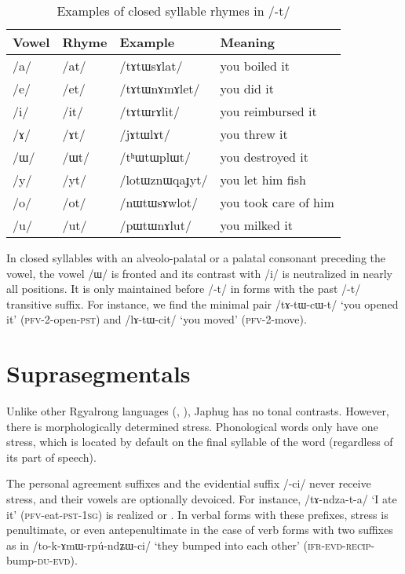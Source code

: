 \documentclass[oneside,a4paper,11pt]{article}
\newcommand{\ipa}[1]{\mbox{\phon/#1/}}
\newcommand{\phonet}[1]{\mbox{\phon[#1]}}
\begin{document}
\begin{table}
 \caption{Examples of closed syllable rhymes in \ipa{-t}} \label{tab:t.rhymes}  \centering
\begin{tabular}{llll}
\toprule
Vowel & Rhyme & Example & Meaning\\
\midrule
\ipa{a} &	   	\ipa{at} &\ipa{tɤtɯsɤlat} &you boiled it\\
\ipa{e} &	  	\ipa{et} &\ipa{tɤtɯnɤmɤlet} & you did it\\
\ipa{i} &	   	\ipa{it} &\ipa{tɤtɯrɤlit} & you reimbursed it\\
\ipa{ɤ} &	   	\ipa{ɤt} &\ipa{jɤtɯlɤt} & you threw it\\
\ipa{ɯ} &	   	\ipa{ɯt} &\ipa{tʰɯtɯplɯt} & you destroyed it \\
\ipa{y} &	 \ipa{yt} &\ipa{lotɯznɯqaɟyt} & you let him fish\\
\ipa{o} & 	\ipa{ot} &\ipa{nɯtɯsɤwlot} & you took care of him\\
\ipa{u} & 	\ipa{ut} & \ipa{pɯtɯnɤlut} & you milked it\\
\bottomrule
\end{tabular}
\end{table}

In closed syllables with an alveolo-palatal or a palatal consonant preceding the vowel, the vowel \ipa{ɯ} is fronted and its contrast with \ipa{i} is neutralized in nearly all positions. It is only maintained before \ipa{-t} in forms with the past \ipa{-t} transitive suffix. For instance, we find the minimal pair \ipa{tɤ-tɯ-cɯ-t} `you opened it' (\textsc{pfv}-2-open-\textsc{pst}) and \ipa{lɤ-tɯ-cit} `you moved' (\textsc{pfv}-2-move).
    
     \section*{Suprasegmentals}
Unlike other Rgyalrong languages (\citealt{jackson05yingao}, \citealt{linyj12tone}), Japhug has no tonal contrasts. However, there is morphologically determined stress. Phonological words only have one stress, which is located by default on the final syllable of the word (regardless of its part of speech).

The personal agreement suffixes and the evidential suffix \ipa{-ci} never receive stress, and their vowels are optionally devoiced. For instance, \ipa{tɤ-ndza-t-a} `I ate it' (\textsc{pfv}-eat-\textsc{pst-1sg}) is realized \phonet{tɤndzátḁ} or \phonet{tɤndzáta}. In verbal forms with these prefixes, stress is penultimate, or even antepenultimate in the case of verb forms with two suffixes as in \ipa{to-k-ɤmɯ-rpú-ndʑɯ-ci} `they bumped into each other' (\textsc{ifr}-\textsc{evd}-\textsc{recip}-bump-\textsc{du-evd}).
\end{document}
